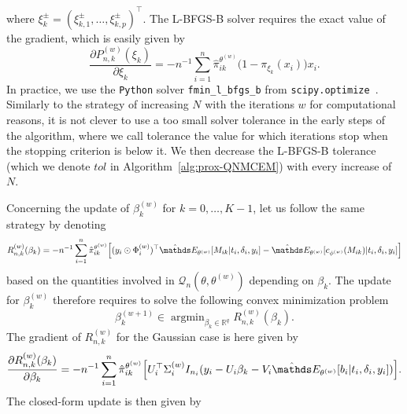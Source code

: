 \documentclass[11pt]{article}
\DeclareMathOperator{\argmin}{argmin}
\newcommand{\cQ}{\mathcal Q}
\newcommand{\R}{\mathds R}
\newcommand{\E}{\mathds E}
\begin{document}
where $\xi_k^\pm = (\xi_{k,1}^\pm, \ldots, \xi_{k,p}^\pm)^\top$. The L-BFGS-B solver requires the exact value of the gradient, which is easily given by
\begin{equation}
  \label{eq:grad-xi_k}
  \frac{\partial P_{n,k}^{(w)}(\xi_k)}{\partial \xi_k} = -n^{-1} \sum_{i=1}^n \hat \pi_{ik}^{\theta^{(w)}} \big( 1 - \pi_{\xi_k}(x_i) \big) x_i.
\end{equation}
In practice, we use the \texttt{Python} solver \texttt{fmin\_l\_bfgs\_b} from \texttt{scipy.optimize}~\citep{virtanen2020scipy}. Similarly to the strategy of increasing $N$ with the iterations $w$ for computational reasons, it is not clever to use a too small solver tolerance in the early steps of the algorithm, where we call tolerance the value for which iterations stop when the stopping criterion is below it. We then decrease the L-BFGS-B tolerance (which we denote $tol$ in Algorithm~\ref{alg:prox-QNMCEM}) with every increase of $N$.

Concerning the update of $\beta_k^{(w)}$ for $k=0, \ldots, K-1$, let us follow the same strategy by denoting
\begin{equation*}
  R^{(w)}_{n,k}(\beta_k) = -n^{-1} \sum_{i=1}^n \hat \pi_{ik}^{\theta^{(w)}} \Big[ (y_i \odot \Phi_i^{(w)})^\top \hat \E_{\theta^{(w)}}[ M_{ik} | t_i, \delta_i, y_i] - \hat \E_{\theta^{(w)}}[ c_{\phi^{(w)}}(M_{ik}) | t_i, \delta_i, y_i] \Big]
\end{equation*}
based on the quantities involved in $\cQ_n(\theta, \theta^{(w)})$ depending on $\beta_k$. The update for $\beta_k^{(w)}$ therefore requires to solve the following convex minimization problem
\begin{equation}
  \label{eq:minimization-beta_k}
  \beta_k^{(w+1)} \in \argmin_{\beta_k \in \R^q} R^{(w)}_{n,k}(\beta_k).
\end{equation}
The gradient of $R_{n,k}^{(w)}$ for the Gaussian case is here given by
\begin{equation}
  \label{eq:grad-beta_k}
  \frac{\partial R_{n,k}^{(w)}(\beta_k)}{\partial \beta_k} = -n^{-1} \sum_{i=1}^n \hat \pi_{ik}^{\theta^{(w)}} \Big[ U_{i}^\top \Sigma_i^{(w)} I_{n_{i}} (y_i - U_{i}\beta_k - V_{i}\hat \E_{\theta^{(w)}}[ b_i | t_i, \delta_i, y_i])\Big].
\end{equation}
The closed-form update is then given by
\end{document}
